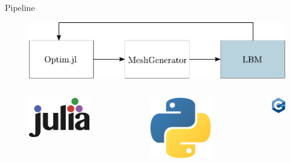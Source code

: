 \documentclass[aspectratio=169,xcolor=dvipsnames]{beamer}
\begin{document}
\begin{frame}{Pipeline}
	\addtocounter{framenumber}{-1}
	\begin{figure}
		\includegraphics[width=0.9\linewidth, trim={0 -0.1cm 0 0}, clip]{Images/pipeline3.pdf}
	\end{figure}
	\vspace{-2mm}
	\begin{columns}[T] %
		\begin{column}{.31\textwidth}
			\begin{figure}
				\includegraphics[width=0.5\linewidth, trim={0 0 0 0}, clip]{Images/julia.png}
			\end{figure}
		\end{column}%
		\begin{column}{.31\textwidth}
			\begin{figure}
				\includegraphics[width=0.35\linewidth, trim={0 0 0 0cm}, clip]{Images/python.png}
			\end{figure}
		\end{column}%
		\begin{column}{.31\textwidth}
			\begin{figure}
				\includegraphics[width=0.35\linewidth, trim={0 0 0 0cm}, clip]{Images/cpp.png}
			\end{figure}
		\end{column}%
	\end{columns}
\end{frame}
\end{document}
